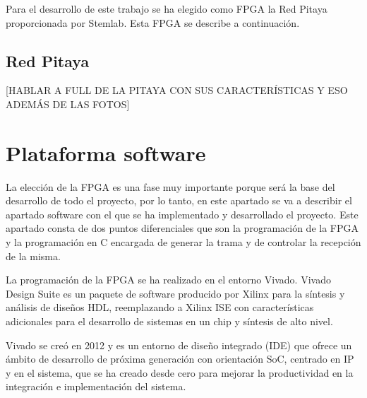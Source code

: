 Para el desarrollo de este trabajo se ha elegido como FPGA la Red Pitaya proporcionada 
por Stemlab. Esta FPGA se describe a continuación.

\subsection{Red Pitaya}
[HABLAR A FULL DE LA PITAYA CON SUS CARACTERÍSTICAS Y ESO ADEMÁS DE LAS FOTOS]

\section{Plataforma software}
La elección de la FPGA es una fase muy importante porque será la base del 
desarrollo de todo el proyecto, por lo tanto, 
en este apartado se va a describir el apartado software con el que se ha implementado
y desarrollado el proyecto. Este apartado consta de dos puntos diferenciales que son la 
programación de la FPGA y la programación en C encargada de generar la trama y de 
controlar la recepción de la misma.

La programación de la FPGA se ha realizado en el entorno Vivado. Vivado Design Suite
es un paquete de software producido por Xilinx para la síntesis y análisis de diseños 
HDL, reemplazando a Xilinx ISE con características adicionales para el desarrollo de 
sistemas en un chip y síntesis de alto nivel. 

Vivado se creó en 2012 y es un entorno de diseño integrado (IDE) que ofrece un ámbito
de desarrollo de próxima generación con orientación SoC, centrado en IP y en el sistema,
que se ha creado desde cero para mejorar la productividad en la integración e 
implementación del sistema.

\chapterend{}